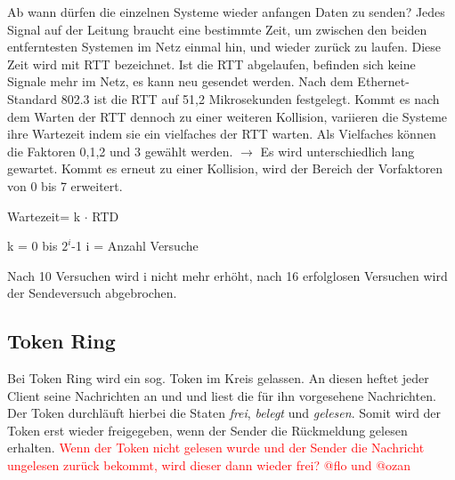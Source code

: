 \documentclass[12pt,a4paper]{article}
\begin{document}
			Ab wann dürfen die einzelnen Systeme wieder anfangen Daten zu senden?\newline\newline
			Jedes Signal auf der Leitung braucht eine bestimmte Zeit, um zwischen den beiden entferntesten Systemen im Netz einmal hin, und wieder zurück zu laufen. Diese Zeit wird mit RTT bezeichnet. Ist die RTT abgelaufen, befinden sich keine Signale mehr im Netz, es kann neu gesendet werden. \newline\newline
			Nach dem Ethernet-Standard 802.3 ist die RTT auf 51,2 Mikrosekunden festgelegt.\newline\newline
			Kommt es nach dem Warten der RTT dennoch zu einer weiteren Kollision, variieren die Systeme ihre Wartezeit indem sie ein vielfaches der RTT warten. Als Vielfaches können die Faktoren 0,1,2 und 3 gewählt werden.\newline
			$\longrightarrow$ Es wird unterschiedlich lang gewartet. \newline\newline
			Kommt es erneut zu einer Kollision, wird der Bereich der Vorfaktoren von 0 bis 7 erweitert.
			\begin{center}
				Wartezeit= k $\cdot$ RTD
			\end{center}
			\begin{center}
				k = 0 bis $2^{i}$-1 \hspace{2cm} i = Anzahl Versuche
			\end{center}
			Nach 10 Versuchen wird i nicht mehr erhöht, nach 16 erfolglosen Versuchen wird der Sendeversuch abgebrochen.

		\subsection{Token Ring}
			Bei Token Ring wird ein sog. Token im Kreis gelassen. An diesen heftet jeder Client seine Nachrichten an und und liest die für ihn vorgesehene Nachrichten. Der Token durchläuft hierbei die Staten \textit{frei}, \textit{belegt} und \textit{gelesen}. Somit wird der Token erst wieder freigegeben, wenn der Sender die Rückmeldung gelesen erhalten. \textcolor{red}{Wenn der Token nicht gelesen wurde und der Sender die Nachricht ungelesen zurück bekommt, wird dieser dann wieder frei? @flo und @ozan}
			
\end{document}

